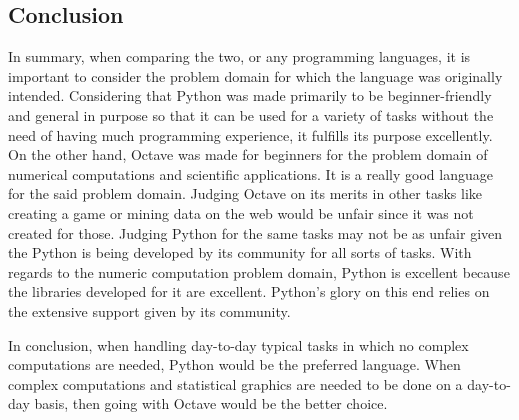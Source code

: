 \documentclass{article}
\begin{document}
\subsection*{Conclusion}
\par
In summary, when comparing the two, or any programming languages, it is important to consider the problem domain for which the language was originally intended. Considering that Python was made primarily to be beginner-friendly and general in purpose so that it can be used for a variety of tasks without the need of having much programming experience, it fulfills its purpose excellently. On the other hand, Octave was made for beginners for the problem domain of numerical computations and scientific applications. It is a really good language for the said problem domain. Judging Octave on its merits in other tasks like creating a game or mining data on the web would be unfair since it was not created for those. Judging Python for the same tasks may not be as unfair given the Python is being developed by its community for all sorts of tasks. With regards to the numeric computation problem domain, Python is excellent because the libraries developed for it are excellent. Python’s glory on this end relies on the extensive support given by its community.
\par
In conclusion, when handling day-to-day typical tasks in which no complex computations are needed, Python would be the preferred language. When complex computations and statistical graphics are needed to be done on a day-to-day basis, then going with Octave would be the better choice.



\pagebreak

\nocite{sebesta_concepts_2016} %
\nocite{klein_2021}
\nocite{arora_2021}
\nocite{eaton_2022}
\nocite{mr_stem_edu_tv_octave_2021}
\nocite{python_datastruct_docu}
\nocite{python_datastruct_docu2}
\nocite{TIOBE_2022}
\nocite{pedamkar_octave_2020}
\nocite{murphy_1997}
\nocite{geeksforgeeks_2020}
\nocite{geeksforgeeks2_2020}
\printbibliography
\end{document}
